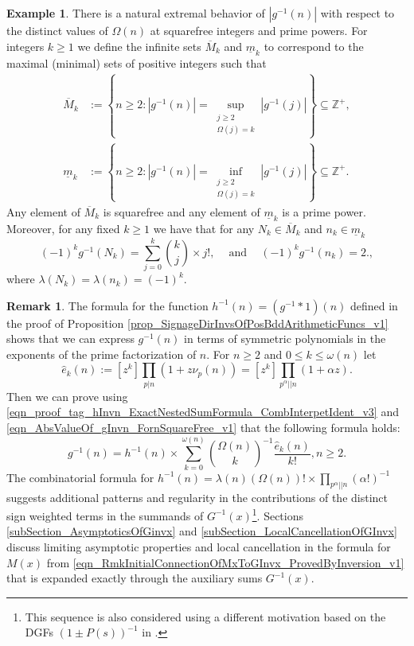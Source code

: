 \documentclass[11pt,reqno,a4letter]{article}
\numberwithin{figure}{section}
\numberwithin{table}{section}
\theoremstyle{plain}
\numberwithin{theorem}{section}
\theoremstyle{definition}
\newtheorem{example}[theorem]{Example}
\newtheorem{remark}[theorem]{Remark}
\begin{document}
\begin{example} 
There is a natural extremal behavior of $|g^{-1}(n)|$ 
with respect to the distinct values of $\Omega(n)$ 
at squarefree integers and prime powers. For integers 
$k \geq 1$ we define the 
infinite sets $\overline{M}_k$ and $\underline{m}_k$ to correspond to the maximal (minimal) sets of 
positive integers such that 
\begin{align*} 
\overline{M}_k & := \left\{n \geq 2: |g^{-1}(n)| = \underset{{\substack{j \geq 2 \\ \Omega(j) = k}}}{\operatorname{sup}} 
     |g^{-1}(j)|\right\} \subseteq \mathbb{Z}^{+}, \\  
\underline{m}_k & := \left\{n \geq 2: |g^{-1}(n)| = \underset{{\substack{j \geq 2 \\ \Omega(j) = k}}}{\operatorname{inf}} 
     |g^{-1}(j)|\right\} \subseteq \mathbb{Z}^{+}. 
\end{align*} 
Any element of $\overline{M}_k$ is squarefree and any element of 
$\underline{m}_k$ is a prime power. 
Moreover, for any fixed $k \geq 1$ 
we have that for any $N_k \in \overline{M}_k$ and $n_k \in \underline{m}_k$
\[
(-1)^{k} g^{-1}(N_k) = \sum_{j=0}^{k} \binom{k}{j} \times j!, 
     \quad \mathrm{\ and\ } \quad 
     (-1)^{k} g^{-1}(n_k) = 2., 
\]
where $\lambda(N_k) = \lambda(n_k) = (-1)^{k}$. 
\end{example}

\begin{remark} 
The formula for the function $h^{-1}(n) = (g^{-1} \ast 1)(n)$ defined in the proof of 
Proposition \ref{prop_SignageDirInvsOfPosBddArithmeticFuncs_v1} shows that we can express 
$g^{-1}(n)$ in terms of symmetric polynomials in the 
exponents of the prime factorization of $n$. 
For $n \geq 2$ and $0 \leq k \leq \omega(n)$ let 
\[
\widehat{e}_k(n) := [z^k] \prod_{p|n} (1 + z \nu_p(n)) = [z^k] \prod_{p^{\alpha} || n} (1 + \alpha z). 
\]
Then we can prove using 
\eqref{eqn_proof_tag_hInvn_ExactNestedSumFormula_CombInterpetIdent_v3} and 
\eqref{eqn_AbsValueOf_gInvn_FornSquareFree_v1} that the following formula holds: 
\[
g^{-1}(n) = h^{-1}(n) \times \sum_{k=0}^{\omega(n)} \binom{\Omega(n)}{k}^{-1} 
     \frac{\widehat{e}_k(n)}{k!}, n \geq 2. 
\]
The combinatorial formula for 
$h^{-1}(n) = \lambda(n) (\Omega(n))! \times \prod_{p^{\alpha} || n} (\alpha !)^{-1}$ 
suggests additional patterns and regularity in the contributions of the distinct sign weighted 
terms in the summands of $G^{-1}(x)$\footnote{ 
     This sequence is also considered using a different motivation based on the DGFs 
     $(1\pm P(s))^{-1}$ in \cite[\S 2]{FROBERG-1968}. 
}. 
Sections \ref{subSection_AsymptoticsOfGinvx} and 
\ref{subSection_LocalCancellationOfGInvx} 
discuss limiting asymptotic properties and local cancellation in the formula for $M(x)$ 
from \eqref{eqn_RmkInitialConnectionOfMxToGInvx_ProvedByInversion_v1} 
that is expanded exactly through the auxiliary sums $G^{-1}(x)$. 
\end{remark}
\end{document}
